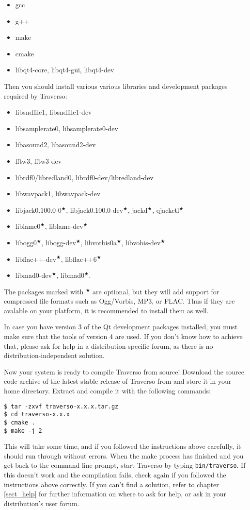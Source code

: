\begin{itemize}
	\item gcc
	\item g++
	\item make
	\item cmake
	\item libqt4-core, libqt4-gui, libqt4-dev
\end{itemize}

Then you should install various various libraries and development packages required by Traverso:

\begin{itemize}
	\item libsndfile1, libsndfile1-dev
	\item libsamplerate0, libsamplerate0-dev
	\item libasound2, libasound2-dev
	\item fftw3, fftw3-dev
	\item librdf0/libredland0, librdf0-dev/libredland-dev
	\item libwavpack1, libwavpack-dev
	\item libjack0.100.0-0$^\bigstar$, libjack0.100.0-dev$^\bigstar$, jackd$^\bigstar$, qjackctl$^\bigstar$
	\item liblame0$^\bigstar$, liblame-dev$^\bigstar$
	\item libogg0$^\bigstar$, libogg-dev$^\bigstar$, libvorbis0a$^\bigstar$, libvobis-dev$^\bigstar$
	\item libflac++-dev$^\bigstar$, libflac++6$^\bigstar$
	\item libmad0-dev$^\bigstar$, libmad0$^\bigstar$.
\end{itemize}

The packages marked with $^\bigstar$ are optional, but they will add support for compressed file formats such as Ogg/Vorbis, MP3, or FLAC. Thus if they are avalable on your platform, it is recommended to install them as well.

In case you have version 3 of the Qt development packages installed, you must make sure that the tools of version 4 are used. If you don't know how to achieve that, please ask for help in a distribution-specific forum, as there is no distribution-independent solution.

Now your system is ready to compile Traverso from source! Download the source code archive of the latest stable release of Traverso from \cite{trav-hp} and store it in your home directory. Extract and compile it with the following commands:

\begin{verbatim}
$ tar -zxvf traverso-x.x.x.tar.gz
$ cd traverso-x.x.x
$ cmake .
$ make -j 2
\end{verbatim}
This will take some time, and if you followed the instructions above carefully, it should run through without errors. When the make process has finished and you get back to the command line prompt, start Traverso by typing \texttt{bin/traverso}. If this doesn't work and the compilation fails, check again if you followed the instructions above correctly. If you can't find a solution, refer to chapter \ref{sect_help} for further information on where to ask for help, or ask in your distribution's user forum.
